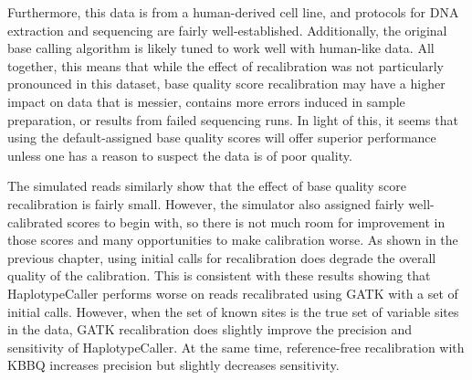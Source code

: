 Furthermore, this data is from a human-derived cell line, and protocols for DNA extraction and sequencing are fairly well-established. Additionally, the original base calling algorithm is likely tuned to work well with human-like data. All together, this means that while the effect of recalibration was not particularly pronounced in this dataset, base quality score recalibration may have a higher impact on data that is messier, contains more errors induced in sample preparation, or results from failed sequencing runs. In light of this, it seems that using the default-assigned base quality scores will offer superior performance unless one has a reason to suspect the data is of poor quality.


The simulated reads similarly show that the effect of base quality score recalibration is fairly small. However, the simulator also assigned fairly well-calibrated scores to begin with, so there is not much room for improvement in those scores and many opportunities to make calibration worse. As shown in the previous chapter, using initial calls for recalibration does degrade the overall quality of the calibration. This is consistent with these results showing that HaplotypeCaller performs worse on reads recalibrated using GATK with a set of initial calls. However, when the set of known sites is the true set of variable sites in the data, GATK recalibration does slightly improve the precision and sensitivity of HaplotypeCaller. At the same time, reference-free recalibration with KBBQ increases precision but slightly decreases sensitivity.

